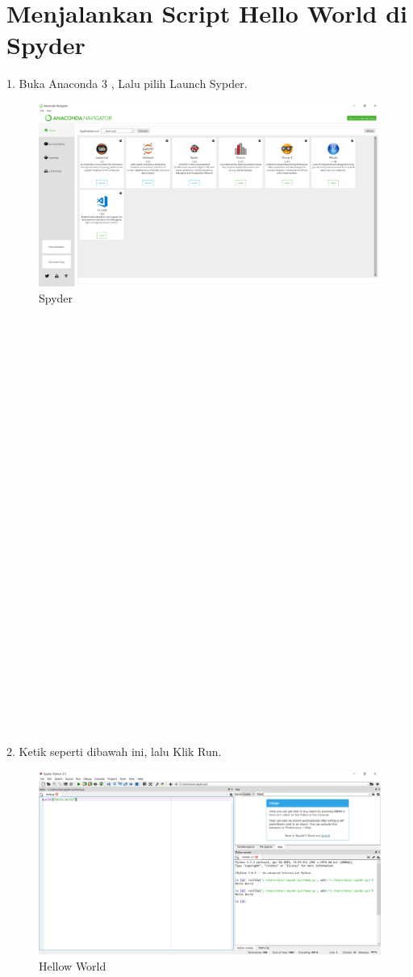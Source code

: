 \documentclass{article}
\begin{document}
\section{Menjalankan Script Hello World di Spyder}
1. Buka Anaconda 3 , Lalu pilih Launch Sypder.\\
\begin{figure}[h]
	\centering
		\includegraphics[scale=0.2]{Gambar/S1}
		\caption{Spyder}
\end{figure}
\\
\\
\\
\\
\\
\\
\\
\\
\\
\\
\\
\\
\\
\\
\\
\\
\\
\\
\\
\\
\\
\\
\\
\\
\\
\\
\\
2. Ketik seperti dibawah ini, lalu Klik Run.\\
\begin{figure}[h]
	\centering
		\includegraphics[scale=0.2]{Gambar/S2}
	\caption{Hellow World}
\end{figure}
\end{document}
